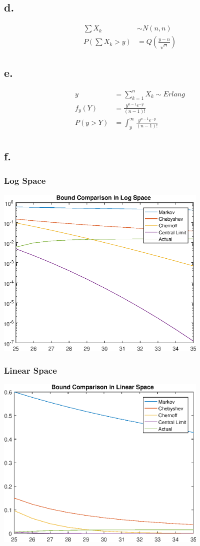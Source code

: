 \documentclass[12pt]{article}
\begin{document}
\subsection{d.}
\begin{align*}
  \sum X_k &\sim N(n,n) \\
  P(\sum X_k > y) &= Q\left( \frac{y-n}{\sqrt{n}} \right)
\end{align*}
\subsection{e.}
\begin{align*}
  y &= \sum_{k=1}^n X_k \sim Erlang \\
  f_y(Y) &= \frac{y^{n-1}e^{-y}}{(n-1)!} \\
  P(y>Y) &= \int_y^\infty \frac{y^{n-1}e^{-y}}{(n-1)!} \\
\end{align*}
\subsection{f.}
\subsubsection{Log Space}
\includegraphics [width=4in]{prob7_27_01.eps}
\subsubsection{Linear Space}
\includegraphics [width=4in]{prob7_27_02.eps}
\end{document}
